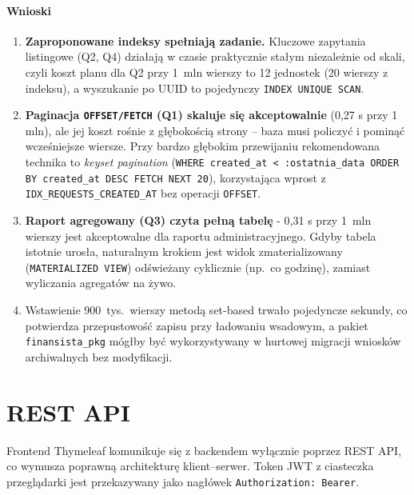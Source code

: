 \documentclass[12pt,a4paper]{article}
\begin{document}
\paragraph{Wnioski}
\begin{enumerate}[leftmargin=*]
  \item \textbf{Zaproponowane indeksy spełniają zadanie.} Kluczowe zapytania
        listingowe (Q2, Q4) działają w czasie praktycznie stałym niezależnie
        od skali, czyli koszt planu dla Q2 przy 1~mln wierszy to 12 jednostek
        (20 wierszy z indeksu), a wyszukanie po UUID to pojedynczy
        \texttt{INDEX UNIQUE SCAN}.
  \item \textbf{Paginacja \texttt{OFFSET/FETCH} (Q1) skaluje się akceptowalnie}
        (0{,}27 s przy 1 mln), ale jej koszt rośnie z głębokością strony --
        baza musi policzyć i pominąć wcześniejsze wiersze. Przy bardzo głębokim
        przewijaniu rekomendowana technika to \emph{keyset pagination}
        (\texttt{WHERE created\_at < :ostatnia\_data ORDER BY created\_at DESC
        FETCH NEXT 20}), korzystająca wprost z \texttt{IDX\_REQUESTS\_CREATED\_AT}
        bez operacji \texttt{OFFSET}.
  \item \textbf{Raport agregowany (Q3) czyta pełną tabelę} - 0{,}31 s przy
        1~mln wierszy jest akceptowalne dla raportu administracyjnego.
        Gdyby tabela istotnie urosła, naturalnym krokiem jest widok
        zmaterializowany (\texttt{MATERIALIZED VIEW}) odświeżany cyklicznie
        (np.\ co godzinę), zamiast wyliczania agregatów na żywo.
  \item Wstawienie 900~tys.\ wierszy metodą set-based trwało pojedyncze
        sekundy, co potwierdza przepustowość zapisu przy ładowaniu wsadowym, 
        a pakiet \texttt{finansista\_pkg} mógłby być wykorzystywany
        w hurtowej migracji wniosków archiwalnych bez modyfikacji.
\end{enumerate}

\section{REST API}
\label{sec:api}

Frontend Thymeleaf komunikuje się z backendem wyłącznie poprzez REST API, co
wymusza poprawną architekturę klient--serwer. Token JWT z ciasteczka przeglądarki
jest przekazywany jako nagłówek \texttt{Authorization: Bearer}.
\end{document}
